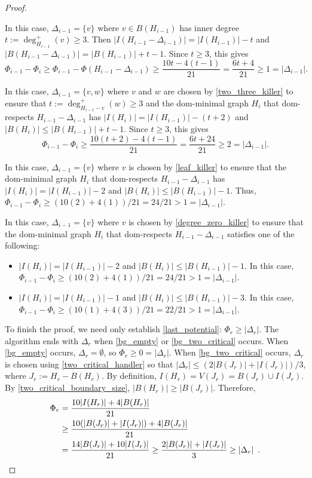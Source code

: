 \documentclass{patmorin}
\begin{document}
\begin{proof}
  \begin{enumerate}[label={[bg\arabic*]},labelwidth=\widthof{[bg0]},leftmargin=!,nosep,nolistsep,start=2]
  \item In this case, $\Delta_{i-1}=\{v\}$ where $v\in B(H_{i-1})$ has inner degree $t:=\deg^+_{H_{i-1}}(v)\ge 3$. Then $|I(H_{i-1}-\Delta_{i-1})|=|I(H_{i-1})|-t$ and $|B(H_{i-1}-\Delta_{i-1})|=|B(H_{i-1})|+t-1$.  Since $t\ge 3$, this gives
  \[
    \Phi_{i-1}-\Phi_{i}\ge\Phi_{i-1}-\Phi(H_{i-1}-\Delta_{i-1})\ge\frac{10t-4(t-1)}{21}
    =\frac{6t+4}{21}\ge 1 = |\Delta_{i-1}|.
  \]
  \item In this case, $\Delta_{i-1}=\{v,w\}$ where $v$ and $w$ are chosen by \cref{two_three_killer} to ensure that $t:=\deg^+_{H_{i-1}-v}(w)\ge 3$ and the dom-minimal graph $H_i$ that dom-respects $H_{i-1}-\Delta_{i-1}$ has $|I(H_i)|=|I(H_{i-1})|-(t+2)$ and $|B(H_i)|\le |B(H_{i-1})|+t-1$.  Since $t\ge 3$, this gives
  \[
     \Phi_{i-1}-\Phi_i \ge \frac{10(t+2)-4(t-1)}{21} = \frac{6t+24}{21} \ge 2 = |\Delta_{i-1}|.
  \]
  \item In this case, $\Delta_{i-1}=\{v\}$ where $v$ is chosen by \cref{leaf_killer} to ensure that the dom-minimal graph $H_i$ that dom-respects $H_{i-1}-\Delta_{i-1}$ has $|I(H_{i})|=|I(H_{i-1})|-2$ and $|B(H_i)|\le |B(H_{i-1})|-1$.  Thus, $\Phi_{i-1}-\Phi_i\ge (10(2)+4(1))/21 = 24/21 > 1=|\Delta_{i-1}|$.
  \item In this case, $\Delta_{i-1}=\{v\}$ where $v$ is chosen by \cref{degree_zero_killer} to ensure that the dom-minimal graph $H_i$ that dom-respects $H_{i-1}-\Delta_{i-1}$ satisfies one of the following:
  \begin{itemize}
     \item $|I(H_i)|=|I(H_{i-1})|-2$ and $|B(H_i)|\le |B(H_{i-1})|-1$. In this case, $\Phi_{i-1}-\Phi_i\ge(10(2)+4(1))/21 = 24/21 > 1=|\Delta_{i-1}|$.
     \item $|I(H_i)|=|I(H_{i-1})|-1$ and $|B(H_i)|\le |B(H_{i-1})|-3$. In this case, $\Phi_{i-1}-\Phi_i\ge(10(1)+4(3))/21 = 22/21 > 1=|\Delta_{i-1}|$.
  \end{itemize} 
\end{enumerate}
To finish the proof, we need only establish \eqref{last_potential}: $\Phi_r \ge |\Delta_r|$.  The algorithm ends with $\Delta_r$ when \ref{bg_empty} or \ref{bg_two_critical} occurs.  When \ref{bg_empty} occurs, $\Delta_r=\emptyset$, so $\Phi_r\ge 0=|\Delta_r|$.  When \ref{bg_two_critical} occurs, $\Delta_r$ is chosen using \cref{two_critical_handler} so that $|\Delta_r|\le (2|B(J_r)|+|I(J_r)|)/3$, where $J_r:=H_r-B(H_r)$.  By definition, $I(H_r)=V(J_r)=B(J_r)\cup I(J_r)$.  By \cref{two_critical_boundary_size}, $|B(H_r)|\ge |B(J_r)|$.  Therefore,
\begin{align*}
   \Phi_r 
   & = \frac{10|I(H_r)|+4|B(H_r)|}{21} \\
   & \ge \frac{10(|B(J_r)|+|I(J_r)|) + 4|B(J_r)|}{21} \\
   & = \frac{14|B(J_r)|+10|I(J_r)|}{21} \ge \frac{2|B(J_r)|+|I(J_r)|}{3}\ge |\Delta_r| \enspace . \qedhere
\end{align*}
\end{proof}
\end{document}
